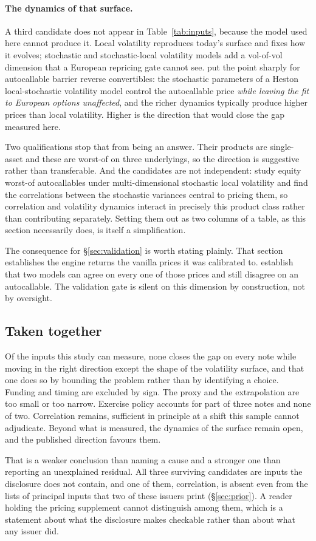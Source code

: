 \paragraph{The dynamics of that surface.} A third candidate does not appear in
Table~\ref{tab:inputs}, because the model used here cannot produce it. Local
volatility reproduces today's surface and fixes how it evolves; stochastic and
stochastic-local volatility models add a vol-of-vol dimension that a European
repricing gate cannot see. \citet{Farkas2022} put the point sharply for
autocallable barrier reverse convertibles: the stochastic parameters of a
Heston local-stochastic volatility model control the autocallable price
\emph{while leaving the fit to European options unaffected}, and the richer
dynamics typically produce higher prices than local volatility. Higher is the
direction that would close the gap measured here.

Two qualifications stop that from being an answer. Their products are
single-asset and these are worst-of on three underlyings, so the direction is
suggestive rather than transferable. And the candidates are not independent:
\citet{DeCol2017} study equity worst-of autocallables under multi-dimensional
stochastic local volatility and find the correlations between the stochastic
variances central to pricing them, so correlation and volatility dynamics
interact in precisely this product class rather than contributing separately.
Setting them out as two columns of a table, as this section necessarily does,
is itself a simplification.

The consequence for \S\ref{sec:validation} is worth stating plainly. That
section establishes the engine returns the vanilla prices it was calibrated to.
\citet{Farkas2022} establish that two models can agree on every one of those
prices and still disagree on an autocallable. The validation gate is silent on
this dimension by construction, not by oversight.

\subsection{Taken together}

Of the inputs this study can measure, none closes the gap on every note while
moving in the right direction except the shape of the volatility surface, and
that one does so by bounding the problem rather than by identifying a choice.
Funding and timing are excluded by sign. The proxy and the extrapolation are
too small or too narrow. Exercise policy accounts for part of three notes and
none of two. Correlation remains, sufficient in principle at a shift this
sample cannot adjudicate. Beyond what is measured, the dynamics of the surface
remain open, and the published direction favours them.

That is a weaker conclusion than naming a cause and a stronger one than
reporting an unexplained residual. All three surviving candidates are inputs
the disclosure does not contain, and one of them, correlation, is absent even
from the lists of principal inputs that two of these issuers print
(\S\ref{sec:prior}). A reader holding the pricing supplement cannot
distinguish among them, which is a statement about what the disclosure makes
checkable rather than about what any issuer did.
